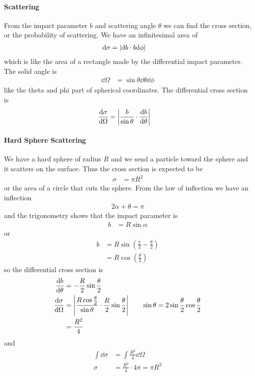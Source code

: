 \documentclass[../main.tex]{subfiles}
\begin{document}
\paragraph*{Scattering} From the impact parameter $b$ and scattering angle $\theta$ we can find the
cross section, or the probability of scattering. We have an infinitesimal area of
\begin{align*}
    \dd \sigma &= \abs{\dd b \cdot b\dd \phi}
\end{align*}
which is like the area of a rectangle made by the differential impact parameter. The solid angle is
\begin{align*}
    \dd \Omega &= \sin\theta \dd \theta \dd \phi
\end{align*}
like the theta and phi part of spherical coordinates. The differential cross section is
\begin{align*}
    \dv{\sigma}{\Omega} &= \abs{\frac{b}{\sin\theta} \cdot \dv{b}{\theta}}
\end{align*}
\paragraph*{Hard Sphere Scattering} We have a hard sphere of radius $R$ and we send a particle 
toward the sphere and it scatters on the surface. Thus the cross section is expected to be
\begin{align*}
    \sigma &= \pi R^2
\end{align*}
or the area of a circle that cuts the sphere. From the law of inflection we have an inflection 
\begin{align*}
    2\alpha + \theta = \pi
\end{align*}
and the trigonometry shows that the impact parameter is
\begin{align*}
    b &= R \sin\alpha
\end{align*}
or
\begin{align*}
    b &= R \sin(\frac{\pi}{2} - \frac{\theta}{2}) \\
    &= R \cos(\frac{\theta}{2})
\end{align*}
so the differential cross section is
\begin{align*}
    \dv{b}{\theta} &= - \frac{R}{2} \sin{\frac{\theta}{2}} \\
    \dv{\sigma}{\Omega} &= \abs{\frac{R\cos\frac{\theta}{2}}{\sin\theta} \cdot \frac{R}{2} \sin\frac{\theta}{2}} 
        \qquad \sin\theta = 2\sin\frac{\theta}{2} \cos\frac{\theta}{2}\\
    &= \frac{R^2}{4}
\end{align*}
and
\begin{align*}
    \int \dd{\sigma} &= \int \frac{R^2}{4} \dd{\Omega} \\
    \sigma &= \frac{R^2}{4} \cdot 4\pi = \pi R^2
\end{align*}
\end{document}
